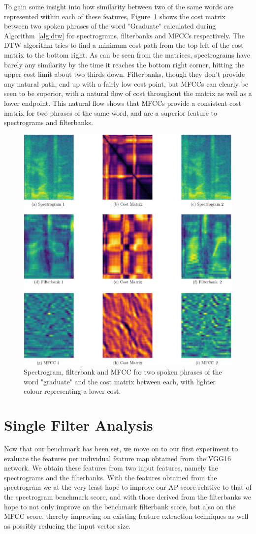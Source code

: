 To gain some insight into how similarity between two of the same words are represented within each of these features, Figure~\ref{fig:cost_matrix} shows the cost matrix between two spoken phrases of the word "Graduate" calculated during Algorithm~\ref{alg:dtw} for spectrograms, filterbanks and MFCCs respectively. 
The DTW algorithm tries to find a minimum cost path from the top left of the cost matrix to the bottom right. 
As can be seen from the matrices, spectrograms have barely any similarity by the time it reaches the bottom right corner, hitting the upper cost limit about two thirds down.
Filterbanks, though they don't provide any natural path, end up with a fairly low cost point, but MFCCs can clearly be seen to be superior, with a natural flow of cost throughout the matrix as well as a lower endpoint.
This natural flow shows that MFCCs provide a consistent cost matrix for two phrases of the same word, and are a superior feature to spectrograms and filterbanks.

\begin{figure}[ht]
    \centering
    \includegraphics[width=0.6\linewidth]{content/fig/cost_matrices.png}
    \caption{Spectrogram, filterbank and MFCC for two spoken phrases of the word "graduate" and the cost matrix between each, with lighter colour representing a lower cost.}
    \label{fig:cost_matrix}
\end{figure}

\section{Single Filter Analysis}

Now that our benchmark has been set, we move on to our first experiment to evaluate the features per individual feature map obtained from the VGG16 network. 
We obtain these features from two input features, namely the spectrograms and the filterbanks.
With the features obtained from the spectrogram we at the very least hope to improve our AP score relative to that of the spectrogram benchmark score, and with those derived from the filterbanks we hope to not only improve on the benchmark filterbank score, but also on the MFCC score, thereby improving on existing feature extraction techniques as well as possibly reducing the input vector size.

